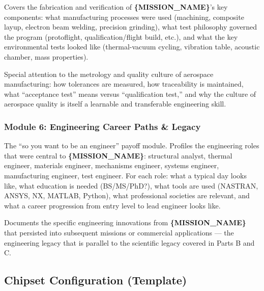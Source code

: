 \documentclass[11pt,letterpaper]{article}
\newcommand{\param}[1]{\textcolor{paramred}{\textbf{\{#1\}}}}
\begin{document}
Covers the fabrication and verification of \param{MISSION\_NAME}'s key components: what manufacturing processes were used (machining, composite layup, electron beam welding, precision grinding), what test philosophy governed the program (protoflight, qualification/flight build, etc.), and what the key environmental tests looked like (thermal-vacuum cycling, vibration table, acoustic chamber, mass properties).

Special attention to the metrology and quality culture of aerospace manufacturing: how tolerances are measured, how traceability is maintained, what ``acceptance test'' means versus ``qualification test,'' and why the culture of aerospace quality is itself a learnable and transferable engineering skill.

\subsubsection{Module 6: Engineering Career Paths \& Legacy}

The ``so you want to be an engineer'' payoff module. Profiles the engineering roles that were central to \param{MISSION\_NAME}: structural analyst, thermal engineer, materials engineer, mechanisms engineer, systems engineer, manufacturing engineer, test engineer. For each role: what a typical day looks like, what education is needed (BS/MS/PhD?), what tools are used (NASTRAN, ANSYS, NX, MATLAB, Python), what professional societies are relevant, and what a career progression from entry level to lead engineer looks like.

Documents the specific engineering innovations from \param{MISSION\_NAME} that persisted into subsequent missions or commercial applications --- the engineering legacy that is parallel to the scientific legacy covered in Parts B and C.

\subsection{Chipset Configuration (Template)}
\end{document}

